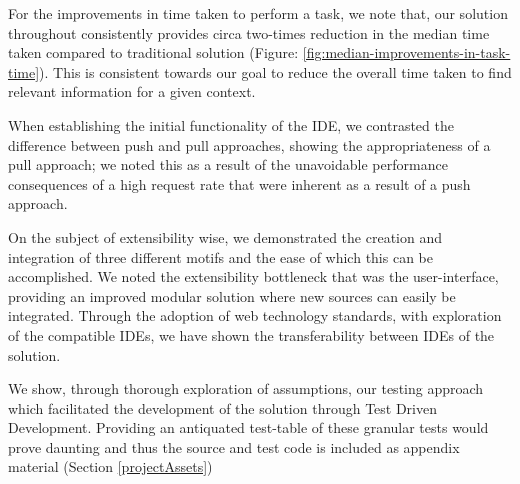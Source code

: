 For the improvements in time taken to perform a task, we note that, our solution throughout consistently provides circa two-times reduction in the median time taken compared to traditional solution (Figure: \ref{fig:median-improvements-in-task-time}). This is consistent towards our goal to reduce the overall time taken to find relevant information for a given context.

When establishing the initial functionality of the IDE, we contrasted the difference between push and pull approaches, showing the appropriateness of a pull approach; we noted this as a result of the unavoidable performance consequences of a high request rate that were inherent as a result of a push approach. 

On the subject of extensibility wise, we demonstrated the creation and integration of three different motifs and the ease of which this can be accomplished. We noted the extensibility bottleneck that was the user-interface, providing an improved modular solution where new sources can easily be integrated. Through the adoption of web technology standards, with exploration of the compatible IDEs, we have shown the transferability between IDEs of the solution.

We show, through thorough exploration of assumptions, our testing approach which facilitated the development of the solution through Test Driven Development. Providing an antiquated test-table of these granular tests would prove daunting and thus the source and test code is included as appendix material (Section \ref{projectAssets})
